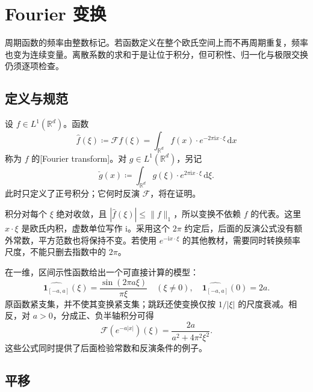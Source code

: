 \section{Fourier 变换}
\label{b2:sec:0301}

周期函数的频率由整数标记。若函数定义在整个欧氏空间上而不再周期重复，频率也变为连续变量。离散系数的求和于是让位于积分，但可积性、归一化与极限交换仍须逐项检查。

\subsection{定义与规范}
\label{b2:subsec:030101}

\begin{definition}\label{b2:def:03-fourier-transform}
设 \(f\in L^1(\mathbb R^d)\)。函数
\begin{equation}\label{b2:eq:03-fourier-definition}
 \widehat f(\xi)\coloneqq\mathcal Ff(\xi)
 =\int_{\mathbb R^d}f(x)\cdot e^{-2\pi\mathrm{i}x\cdot\xi}\,\mathrm{d}x
\end{equation}
称为 \(f\) 的[Fourier transform]。对 \(g\in L^1(\mathbb R^d)\)，另记
\[
 \check g(x)\coloneqq\int_{\mathbb R^d}g(\xi)\cdot e^{2\pi\mathrm{i}x\cdot\xi}\,\mathrm{d}\xi.
\]
此时只定义了正号积分；它何时反演 \(\mathcal F\)，将在证明。
\end{definition}

积分对每个 \(\xi\) 绝对收敛，且 \(|\widehat f(\xi)|\leq\|f\|_1\)，所以变换不依赖 \(f\) 的代表。这里 \(x\cdot\xi\) 是欧氏内积，虚数单位写作 \(\mathrm{i}\)。采用这个 \(2\pi\) 约定后，后面的反演公式没有额外常数，平方范数也将保持不变。若使用 \(e^{-\mathrm{i}x\cdot\xi}\) 的其他教材，需要同时转换频率尺度，不能只删去指数中的 \(2\pi\)。

\ProseParagraphBreak

在一维，区间示性函数给出一个可直接计算的模型：
\[
 \widehat{\mathbf1_{[-a,a]}}(\xi)=\dfrac{\sin(2\pi a\xi)}{\pi\xi}\quad(\xi\ne0),
 \quad \widehat{\mathbf1_{[-a,a]}}(0)=2a.
\]
原函数紧支集，并不使其变换紧支集；跳跃还使变换仅按 \(1/|\xi|\) 的尺度衰减。相反，对 \(a>0\)，分成正、负半轴积分可得
\[
 \mathcal F(e^{-a|x|})(\xi)=\dfrac{2a}{a^2+4\pi^2\xi^2}.
\]
这些公式同时提供了后面检验常数和反演条件的例子。

\subsection{平移}
\label{b2:subsec:030102}

